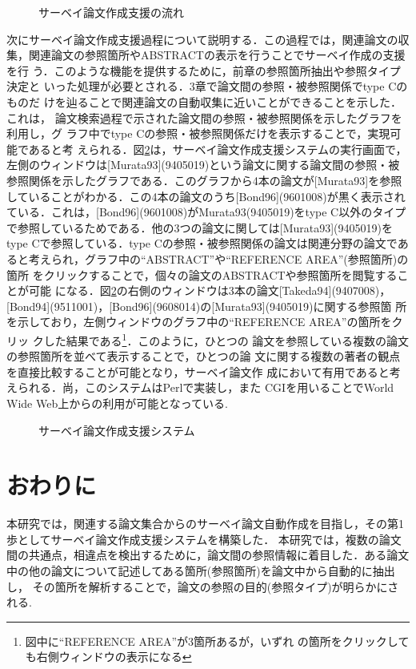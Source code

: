 \begin{figure}[t]
\centering
{}
\caption{サーベイ論文作成支援の流れ\label{fig:system}}
\end{figure}

次にサーベイ論文作成支援過程について説明する．この過程では，関連論文の収
集，関連論文の参照箇所やABSTRACTの表示を行うことでサーベイ作成の支援を行
う．このような機能を提供するために，前章の参照箇所抽出や参照タイプ決定と
いった処理が必要とされる．3章で論文間の参照・被参照関係でtype Cのものだ
けを辿ることで関連論文の自動収集に近いことができることを示した．これは，
論文検索過程で示された論文間の参照・被参照関係を示したグラフを利用し，グ
ラフ中でtype Cの参照・被参照関係だけを表示することで，実現可能であると考
えられる．図\ref{fig:sss}は，サーベイ論文作成支援システムの実行画面で，
左側のウィンドウは[Murata93](9405019)という論文に関する論文間の参照・被
参照関係を示したグラフである．このグラフから4本の論文が[Murata93]を参照
していることがわかる．この4本の論文のうち[Bond96](9601008)が黒く表示され
ている．これは，[Bond96](9601008)がMurata93(9405019)をtype C以外のタイプ
で参照しているためである．他の3つの論文に関しては[Murata93](9405019)を
type Cで参照している．type Cの参照・被参照関係の論文は関連分野の論文であ
ると考えられ，グラフ中の``ABSTRACT''や``REFERENCE AREA''(参照箇所)の箇所
をクリックすることで，個々の論文のABSTRACTや参照箇所を閲覧することが可能
になる．図\ref{fig:sss}の右側のウィンドウは3本の論文[Takeda94](9407008)，
[Bond94](9511001)，[Bond96](9608014)の[Murata93](9405019)に関する参照箇
所を示しており，左側ウィンドウのグラフ中の``REFERENCE AREA''の箇所をクリッ
クした結果である\footnote{図中に``REFERENCE AREA''が3箇所あるが，いずれ
の箇所をクリックしても右側ウィンドウの表示になる}．このように，ひとつの
論文を参照している複数の論文の参照箇所を並べて表示することで，ひとつの論
文に関する複数の著者の観点を直接比較することが可能となり，サーベイ論文作
成において有用であると考えられる．尚，このシステムはPerlで実装し，また
CGIを用いることでWorld Wide Web上からの利用が可能となっている.

\begin{figure}[t]
\centering
{}
\caption{サーベイ論文作成支援システム\label{fig:sss}}
\end{figure}

\section{おわりに}

本研究では，関連する論文集合からのサーベイ論文自動作成を目指し，その第1
歩としてサーベイ論文作成支援システムを構築した． 本研究では，複数の論文
間の共通点，相違点を検出するために，論文間の参照情報に着目した．ある論文
中の他の論文について記述してある箇所(参照箇所)を論文中から自動的に抽出し，
その箇所を解析することで，論文の参照の目的(参照タイプ)が明らかにされる.

